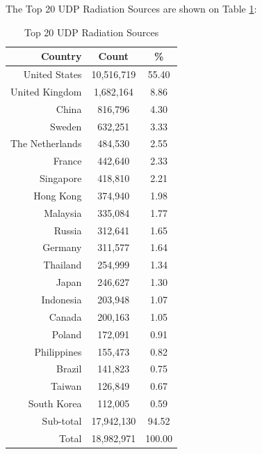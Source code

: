 \newpage
The Top 20 UDP Radiation Sources are shown on Table \ref{tab:top20udpradiationsources}:
\begin{table}[!h]
\begin{center}
\caption{Top 20 UDP Radiation Sources}
\label{tab:top20udpradiationsources}
\begin{tabular}{ |r|c|c| }
\hline
\centering Country & Count & \%  \\
\hline
United States & 10,516,719 & 55.40  \\
United Kingdom & 1,682,164 & 8.86  \\
China & 816,796 & 4.30  \\
Sweden & 632,251 & 3.33  \\
The Netherlands & 484,530 & 2.55  \\
France & 442,640 & 2.33  \\
Singapore & 418,810 & 2.21  \\
Hong Kong & 374,940 & 1.98  \\
Malaysia & 335,084 & 1.77  \\
Russia & 312,641 & 1.65  \\
Germany & 311,577 & 1.64  \\
Thailand & 254,999 & 1.34  \\
Japan & 246,627 & 1.30  \\
Indonesia & 203,948 & 1.07  \\
Canada & 200,163 & 1.05  \\
Poland & 172,091 & 0.91  \\
Philippines & 155,473 & 0.82  \\
Brazil & 141,823 & 0.75  \\
Taiwan & 126,849 & 0.67  \\
South Korea & 112,005 & 0.59  \\
\hline
Sub-total & 17,942,130 & 94.52  \\
\hline
Total & 18,982,971 & 100.00  \\
\hline
\end{tabular}
\end{center}
\end{table}

